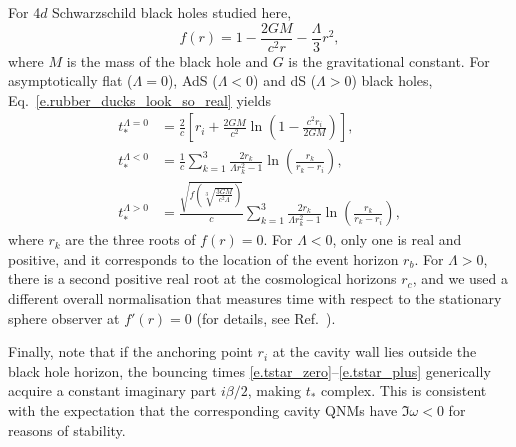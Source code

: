 \documentclass[prd,aps,twocolumn,amsfonts,showpacs,superscriptaddress,preprintnumbers,nofootinbib]{revtex4-2}
\begin{document}
For 4$d$ Schwarzschild black holes studied here,
\begin{equation}
    f(r)=1-\frac{2GM}{c^2r}-\frac{\Lambda}{3}r^2,
\end{equation}
where $M$ is the mass of the black hole and $G$ is the gravitational constant. For asymptotically flat ($\Lambda=0$), AdS ($\Lambda<0$) and dS ($\Lambda>0$) black holes, Eq.~\eqref{e.rubber_ducks_look_so_real} yields
\begin{align}
    t_*^{\Lambda=0}&=\frac{2}{c}\left[r_i+\frac{2GM}{c^2}\ln\left(1-\frac{c^2r_i}{2GM}\right)\right],\label{e.tstar_zero}\\
    t_*^{\Lambda<0}&=\frac{1}{c}\sum_{k=1}^3\frac{2r_k}{\Lambda r_k^2-1}\ln\left(\frac{r_k}{r_k-r_i}\right),\label{e.tstar_minus}\\
    t_*^{\Lambda>0}&=\frac{\sqrt{f\!\left(\!\sqrt[3]{\frac{3GM}{c^2\Lambda}}\right)}}{c}\sum_{k=1}^3\frac{2r_k}{\Lambda r_k^2-1}\ln\left(\frac{r_k}{r_k-r_i}\right),\label{e.tstar_plus}
\end{align}
where $r_k$ are the three roots of $f(r)=0$. For $\Lambda<0$, only one is real and positive, and it corresponds to the location of the event horizon $r_b$. For $\Lambda>0$, there is a second positive real root at the cosmological horizons $r_c$, and we used a different overall normalisation that measures time with respect to the stationary sphere observer at $f'(r)=0$ (for details, see Ref.~\cite{Grozdanov:2026ktq}).

Finally, note that if the anchoring point $r_i$ at the cavity wall lies outside the black hole horizon, the bouncing times \eqref{e.tstar_zero}--\eqref{e.tstar_plus} generically acquire a constant imaginary part $i\beta/2$, making $t_*$ complex. This is consistent with the expectation that the corresponding cavity QNMs have $\Im \omega < 0$ for reasons of stability.
\end{document}
